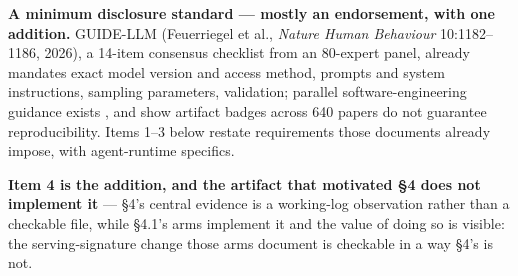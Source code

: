 \textbf{A minimum disclosure standard --- mostly an endorsement, with one addition.} GUIDE-LLM (Feuerriegel et al., \emph{Nature Human Behaviour} 10:1182--1186, 2026), a 14-item consensus checklist from an 80-expert panel, already mandates exact model version and access method, prompts and system instructions, sampling parameters, validation; parallel software-engineering guidance exists \citep{baltes2026guidelinesempiricalstudiessoftware,korn2026reportingllmpromptingautomated}, and \citet{siddiq2025largelanguagemodelssoftware} show artifact badges across 640 papers do not guarantee reproducibility. Items 1--3 below restate requirements those documents already impose, with agent-runtime specifics.

\textbf{Item 4 is the addition, and the artifact that motivated \S4 does not implement it} --- \S4's central evidence is a working-log observation rather than a checkable file, while \S4.1's arms implement it and the value of doing so is visible: the serving-signature change those arms document is checkable in a way \S4's is not.

